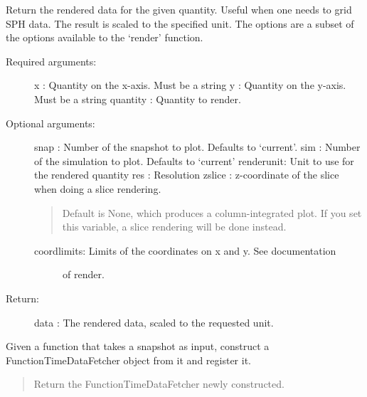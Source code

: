 \documentclass[letterpaper,10pt,english]{sphinxmanual}
\begin{document}
\begin{fulllineitems}
\label{index:facade.get_render_data}
Return the rendered data for the given quantity. Useful when one needs
to grid SPH data. The result is scaled to the specified unit. The options are 
a subset of the options available to the `render' function.
\begin{description}
\item[{Required arguments:}] \leavevmode
x        : Quantity on the x-axis. Must be a string
y        : Quantity on the y-axis. Must be a string
quantity : Quantity to render.

\item[{Optional arguments:}] \leavevmode
snap     : Number of the snapshot to plot. Defaults to `current'.
sim      : Number of the simulation to plot. Defaults to `current'
renderunit: Unit to use for the rendered quantity
res      : Resolution
zslice   : z-coordinate of the slice when doing a slice rendering.
\begin{quote}

Default is None, which produces a column-integrated plot.
If you set this variable, a slice rendering will be
done instead.
\end{quote}
\begin{description}
\item[{coordlimits: Limits of the coordinates on x and y. See documentation}] \leavevmode
of render.

\end{description}

\item[{Return:}] \leavevmode
data     : The rendered data, scaled to the requested unit.

\end{description}

\end{fulllineitems}


\begin{fulllineitems}
\label{index:facade.CreateTimeData}
Given a function that takes a snapshot as input, construct a 
FunctionTimeDataFetcher object from it and register it.
\begin{quote}

Return the FunctionTimeDataFetcher newly constructed.
\end{quote}

\end{fulllineitems}
\end{document}

